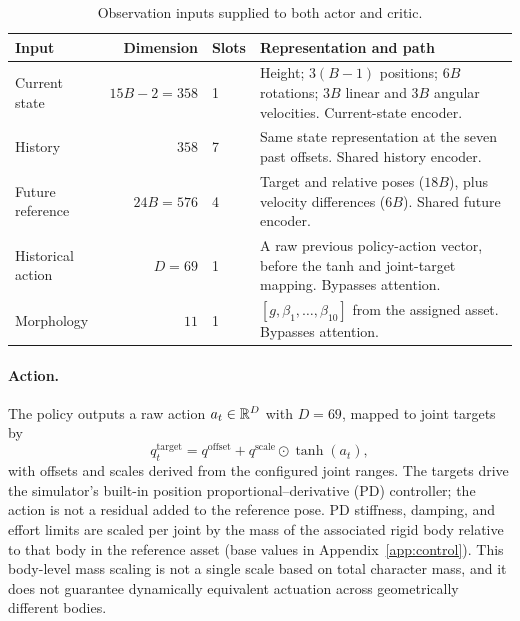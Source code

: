 \begin{table}[!htb]
\centering
\small
\caption{Observation inputs supplied to both actor and critic.}\label{tab:observations}
\begin{tabularx}{\linewidth}{@{}lrlY@{}}
\toprule
Input & Dimension & Slots & Representation and path \\
\midrule
Current state & $15B-2=358$ & 1 &
Height; $3(B-1)$ positions; $6B$ rotations; $3B$ linear and $3B$ angular
velocities. Current-state encoder. \\
History & $358$ & 7 &
Same state representation at the seven past offsets. Shared history encoder. \\
Future reference & $24B=576$ & 4 &
Target and relative poses ($18B$), plus velocity differences ($6B$).
Shared future encoder. \\
Historical action & $D=69$ & 1 &
A raw previous policy-action vector, before the tanh and joint-target mapping.
Bypasses attention. \\
Morphology & $11$ & 1 &
$[g,\beta_1,\ldots,\beta_{10}]$ from the assigned asset.
Bypasses attention. \\
\bottomrule
\end{tabularx}
\end{table}

\paragraph{Action.}
The policy outputs a raw action $a_t\in\mathbb{R}^D$ with $D=69$, mapped to joint
targets by
\begin{equation}
    q_t^{\mathrm{target}}
      = q^{\mathrm{offset}}
        + q^{\mathrm{scale}}\odot\tanh(a_t),
    \label{eq:action_mapping}
\end{equation}
with offsets and scales derived from the configured joint ranges. The targets
drive the simulator's built-in position proportional--derivative (PD)
controller; the action is not a residual added to the reference pose. PD
stiffness, damping, and effort limits are scaled per joint by the mass of the
associated rigid body relative to that body in the reference asset (base values
in Appendix~\ref{app:control}). This body-level mass scaling is not a single
scale based on total character mass, and it does not guarantee dynamically
equivalent actuation across geometrically different bodies.

